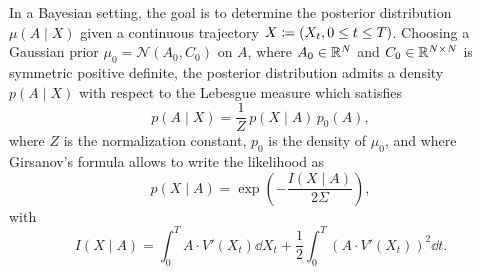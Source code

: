 \documentclass[10pt]{article}
\begin{document}
In a Bayesian setting, the goal is to determine the posterior distribution $\mu(A \mid X)$ given a continuous trajectory $X \coloneqq (X_t, 0 \leq t \leq T)$. Choosing a Gaussian prior $\mu_0 = \mathcal N(A_0, C_0)$ on $A$, where $A_0 \in \mathbb{R}^N$ and $C_0 \in \mathbb{R}^{N\times N}$ is symmetric positive definite, the posterior distribution admits a density $p(A \mid X)$ with respect to the Lebesgue measure which satisfies
\begin{equation}
	p(A \mid X) = \frac1Z \, p(X \mid A) \, p_0(A),
\end{equation}
where $Z$ is the normalization constant, $p_0$ is the density of $\mu_0$, and where Girsanov's formula allows to write the likelihood as
\begin{equation}
	p(X \mid A) = \exp\left(-\frac{I(X\mid A)}{2\Sigma} \right), 
\end{equation}
with
\begin{equation}
	I(X\mid A) = \int_0^T A \cdot V'(X_t) \dd X_t + \frac12 \int_0^T \left( A \cdot V'(X_t) \right)^2 \dd t.
\end{equation}
\end{document}
